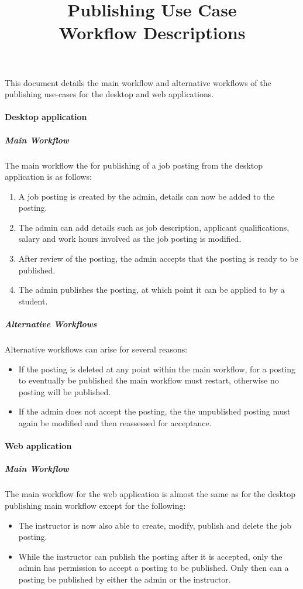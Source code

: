 \documentclass[12pt]{article}
\title{Publishing Use Case \\ Workflow Descriptions}
\date{}
\begin{document}
	\maketitle
		This document details the main workflow and alternative workflows of the publishing use-cases for the desktop and web applications.
	\paragraph {Desktop application}
		\subparagraph{Main Workflow\\}
			The main workflow the for publishing of a job posting from the desktop application is as follows:
			\begin{enumerate}
				\item A job posting is created by the admin, details can now be added to the posting.
				\item The admin can add details such as job description, applicant qualifications, salary and work hours involved as the job posting is modified.
				\item After review of the posting, the admin accepts that the posting is ready to be published.
				\item The admin publishes the posting, at which point it can be applied to by a student.
			\end{enumerate}
		\subparagraph{Alternative Workflows\\}
			Alternative workflows can arise for several reasons:
			\begin{itemize}
				\item If the posting is deleted at any point within the main workflow, for a posting to eventually be published the main workflow must restart, otherwise no posting will be published.
				\item If the admin does not accept the posting, the the unpublished posting must again be modified and then reassessed for acceptance.
			\end{itemize}

	\paragraph{Web application}
		\subparagraph{Main Workflow\\}
			The main workflow for the web application is almost the same as for the desktop publishing main workflow except for the following:
			\begin{itemize}
				\item The instructor is now also able to create, modify, publish and delete the job posting.
				\item While the instructor can publish the posting after it is accepted, only the admin has permission to accept a posting to be published. Only then can a posting be published by either the admin or the instructor. 
			\end{itemize}
				

			
\end{document}
